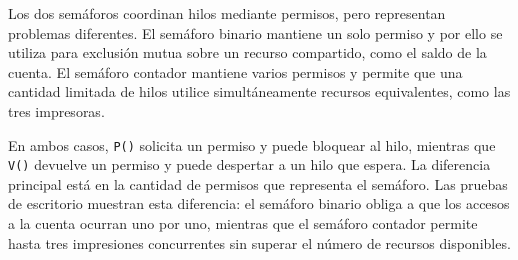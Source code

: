 \documentclass[12pt,oneside]{template/liverpoolthesis}
\begin{document}
Los dos semáforos coordinan hilos mediante permisos, pero representan problemas
diferentes. El semáforo binario mantiene un solo permiso y por ello se utiliza
para exclusión mutua sobre un recurso compartido, como el saldo de la cuenta.
El semáforo contador mantiene varios permisos y permite que una cantidad
limitada de hilos utilice simultáneamente recursos equivalentes, como las tres
impresoras.

En ambos casos, \texttt{P()} solicita un permiso y puede bloquear al hilo,
mientras que \texttt{V()} devuelve un permiso y puede despertar a un hilo que
espera. La diferencia principal está en la cantidad de permisos que representa
el semáforo. Las pruebas de escritorio muestran esta diferencia: el semáforo
binario obliga a que los accesos a la cuenta ocurran uno por uno, mientras que
el semáforo contador permite hasta tres impresiones concurrentes sin superar el
número de recursos disponibles.

\cleardoublepage
{}
{}
\nocite{*}

\end{document}
